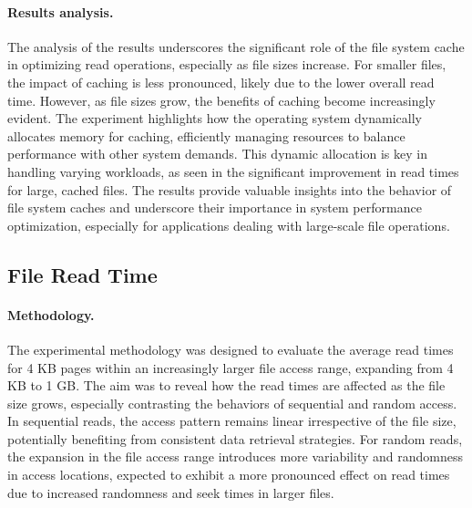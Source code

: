 \paragraph{Results analysis.}
The analysis of the results underscores the significant role of the file system cache in optimizing read operations, especially as file sizes increase. For smaller files, the impact of caching is less pronounced, likely due to the lower overall read time. However, as file sizes grow, the benefits of caching become increasingly evident. The experiment highlights how the operating system dynamically allocates memory for caching, efficiently managing resources to balance performance with other system demands. This dynamic allocation is key in handling varying workloads, as seen in the significant improvement in read times for large, cached files. The results provide valuable insights into the behavior of file system caches and underscore their importance in system performance optimization, especially for applications dealing with large-scale file operations.

\subsection{File Read Time}
\paragraph{Methodology.}
The experimental methodology was designed to evaluate the average read times for 4 KB pages within an increasingly larger file access range, expanding from 4 KB to 1 GB. The aim was to reveal how the read times are affected as the file size grows, especially contrasting the behaviors of sequential and random access. In sequential reads, the access pattern remains linear irrespective of the file size, potentially benefiting from consistent data retrieval strategies. For random reads, the expansion in the file access range introduces more variability and randomness in access locations, expected to exhibit a more pronounced effect on read times due to increased randomness and seek times in larger files.

